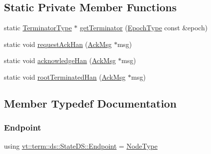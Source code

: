 \subsection*{Static Private Member Functions}
\begin{DoxyCompactItemize}
\item 
static \hyperlink{structvt_1_1term_1_1ds_1_1_state_d_s_af98cfe31c25f710273ee103026d538e4}{Terminator\+Type} $\ast$ \hyperlink{structvt_1_1term_1_1ds_1_1_state_d_s_a291452cba8050d7a5e377b1e86c3f42a}{get\+Terminator} (\hyperlink{namespacevt_a81d11b28122d43bf9834577e4a06440f}{Epoch\+Type} const \&epoch)
\item 
static void \hyperlink{structvt_1_1term_1_1ds_1_1_state_d_s_a495c3114bf861786f7b5bcb6f57941dc}{request\+Ack\+Han} (\hyperlink{structvt_1_1term_1_1ds_1_1_ack_msg}{Ack\+Msg} $\ast$msg)
\item 
static void \hyperlink{structvt_1_1term_1_1ds_1_1_state_d_s_ab23731c48967204f38d54e2241952b9f}{acknowledge\+Han} (\hyperlink{structvt_1_1term_1_1ds_1_1_ack_msg}{Ack\+Msg} $\ast$msg)
\item 
static void \hyperlink{structvt_1_1term_1_1ds_1_1_state_d_s_ac18e56eb23a88586bbf9e61023ec1ec9}{root\+Terminated\+Han} (\hyperlink{structvt_1_1term_1_1ds_1_1_ack_msg}{Ack\+Msg} $\ast$msg)
\end{DoxyCompactItemize}


\subsection{Member Typedef Documentation}
\mbox{\label{structvt_1_1term_1_1ds_1_1_state_d_s_aba302de614dd639f5d93f4f5b6dd6108}} 
\subsubsection{\texorpdfstring{Endpoint}{Endpoint}}
{\footnotesize\ttfamily using \hyperlink{structvt_1_1term_1_1ds_1_1_state_d_s_aba302de614dd639f5d93f4f5b6dd6108}{vt\+::term\+::ds\+::\+State\+D\+S\+::\+Endpoint} =  \hyperlink{namespacevt_a866da9d0efc19c0a1ce79e9e492f47e2}{Node\+Type}}

\mbox{\label{structvt_1_1term_1_1ds_1_1_state_d_s_af98cfe31c25f710273ee103026d538e4}} 
